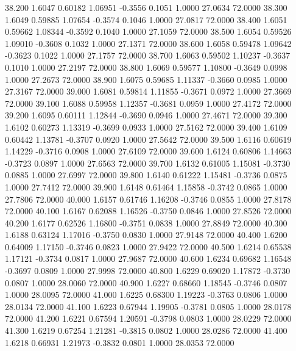   38.200   1.6047   0.60182   1.06951  -0.3556   0.1051   1.0000  27.0634  72.0000
  38.300   1.6049   0.59885   1.07654  -0.3574   0.1046   1.0000  27.0817  72.0000
  38.400   1.6051   0.59662   1.08344  -0.3592   0.1040   1.0000  27.1059  72.0000
  38.500   1.6054   0.59526   1.09010  -0.3608   0.1032   1.0000  27.1371  72.0000
  38.600   1.6058   0.59478   1.09642  -0.3623   0.1022   1.0000  27.1757  72.0000
  38.700   1.6063   0.59502   1.10237  -0.3637   0.1010   1.0000  27.2197  72.0000
  38.800   1.6069   0.59577   1.10800  -0.3649   0.0998   1.0000  27.2673  72.0000
  38.900   1.6075   0.59685   1.11337  -0.3660   0.0985   1.0000  27.3167  72.0000
  39.000   1.6081   0.59814   1.11855  -0.3671   0.0972   1.0000  27.3669  72.0000
  39.100   1.6088   0.59958   1.12357  -0.3681   0.0959   1.0000  27.4172  72.0000
  39.200   1.6095   0.60111   1.12844  -0.3690   0.0946   1.0000  27.4671  72.0000
  39.300   1.6102   0.60273   1.13319  -0.3699   0.0933   1.0000  27.5162  72.0000
  39.400   1.6109   0.60442   1.13781  -0.3707   0.0920   1.0000  27.5642  72.0000
  39.500   1.6116   0.60619   1.14229  -0.3716   0.0908   1.0000  27.6109  72.0000
  39.600   1.6124   0.60806   1.14663  -0.3723   0.0897   1.0000  27.6563  72.0000
  39.700   1.6132   0.61005   1.15081  -0.3730   0.0885   1.0000  27.6997  72.0000
  39.800   1.6140   0.61222   1.15481  -0.3736   0.0875   1.0000  27.7412  72.0000
  39.900   1.6148   0.61464   1.15858  -0.3742   0.0865   1.0000  27.7806  72.0000
  40.000   1.6157   0.61746   1.16208  -0.3746   0.0855   1.0000  27.8178  72.0000
  40.100   1.6167   0.62088   1.16526  -0.3750   0.0846   1.0000  27.8526  72.0000
  40.200   1.6177   0.62526   1.16800  -0.3751   0.0838   1.0000  27.8849  72.0000
  40.300   1.6188   0.63124   1.17016  -0.3750   0.0830   1.0000  27.9148  72.0000
  40.400   1.6200   0.64009   1.17150  -0.3746   0.0823   1.0000  27.9422  72.0000
  40.500   1.6214   0.65538   1.17121  -0.3734   0.0817   1.0000  27.9687  72.0000
  40.600   1.6234   0.69682   1.16548  -0.3697   0.0809   1.0000  27.9998  72.0000
  40.800   1.6229   0.69020   1.17872  -0.3730   0.0807   1.0000  28.0060  72.0000
  40.900   1.6227   0.68660   1.18545  -0.3746   0.0807   1.0000  28.0095  72.0000
  41.000   1.6225   0.68300   1.19223  -0.3763   0.0806   1.0000  28.0134  72.0000
  41.100   1.6223   0.67944   1.19905  -0.3781   0.0805   1.0000  28.0178  72.0000
  41.200   1.6221   0.67594   1.20591  -0.3798   0.0803   1.0000  28.0229  72.0000
  41.300   1.6219   0.67254   1.21281  -0.3815   0.0802   1.0000  28.0286  72.0000
  41.400   1.6218   0.66931   1.21973  -0.3832   0.0801   1.0000  28.0353  72.0000
